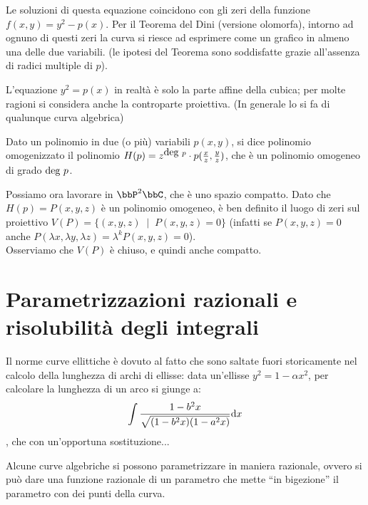 Le soluzioni di questa equazione coincidono con gli zeri della funzione $f(x,y) = y^2 - p(x)$.  Per il Teorema del Dini (versione olomorfa), intorno ad ognuno di questi zeri la curva si riesce ad esprimere come un grafico in almeno una delle due variabili.  (le ipotesi del Teorema sono soddisfatte grazie all'assenza di radici multiple di $p$).


L'equazione $y^2=p(x)$ in realtà è solo la parte affine della cubica; per molte ragioni si considera anche la controparte proiettiva. (In generale lo si fa di qualunque curva algebrica)

\begin{definizione}
  Dato un polinomio in due (o più) variabili $p(x,y)$, si dice polinomio omogenizzato il polinomio $H(p)=z^{\mbox{deg } p} \cdot p(\frac{x}{z}, \frac{y}{z})$, che è un polinomio omogeneo di grado $\mbox{deg } p$.
\end{definizione}

Possiamo ora lavorare in $\bbP^2 \bbC$, che è uno spazio compatto. Dato che $H(p)=P(x,y,z)$ è un polinomio omogeneo, è ben definito il luogo di zeri sul proiettivo $V(P)=\{ (x,y,z) \;\mid\; P(x,y,z) = 0 \}$ (infatti se $P(x,y,z)=0$ anche $P(\lambda x,\lambda y,\lambda z)=\lambda^kP(x,y,z)=0$).\\
Osserviamo che $V(P)$ è chiuso, e quindi anche compatto.



\section{Parametrizzazioni razionali e risolubilità degli integrali}
Il norme curve ellittiche è dovuto al fatto che sono saltate fuori storicamente nel calcolo della lunghezza di archi di ellisse: data un'ellisse $y^2 = 1 - \alpha x^2$, per calcolare la lunghezza di un arco si giunge a:
  $$ \int \frac{1-b^2 x}{\sqrt{(1-b^2 x) (1-a^2 x)}} \text{d} x$$, che con un'opportuna sostituzione...

Alcune curve algebriche si possono parametrizzare in maniera razionale, ovvero si può dare una funzione razionale di un parametro che mette ``in bigezione'' il parametro con dei punti della curva.

